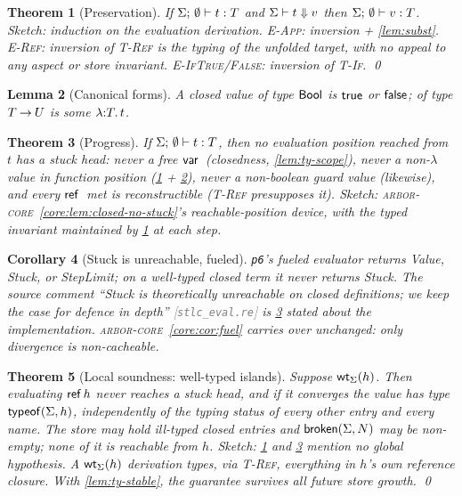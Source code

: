 \documentclass[11pt]{article}
\theoremstyle{definition}
\theoremstyle{plain}
\newtheorem{theorem}{Theorem}[section]
\newtheorem{lemma}[theorem]{Lemma}
\newtheorem{corollary}[theorem]{Corollary}
\theoremstyle{remark}
\newcommand{\src}[1]{{\footnotesize\textcolor{gray}{[\texttt{#1}]}}}
\newcommand{\arborcore}{\textsc{arbor-core}}
\newcommand{\coreref}[1]{\arborcore~\cref{core:#1}}
\begin{document}
\begin{theorem}[Preservation]\label{thm:pres}
If $\Sigma;\,\emptyset \vdash t : T$ and $\Sigma \vdash t \Downarrow v$ then
$\Sigma;\,\emptyset \vdash v : T$.
\emph{Sketch:} induction on the evaluation derivation. \textsc{E-App}: inversion +
\cref{lem:subst}. \textsc{E-Ref}: inversion of \textsc{T-Ref} is the typing of the unfolded
target, with no appeal to any aspect or store invariant. \textsc{E-IfTrue/False}:
inversion of \textsc{T-If}. \qed
\end{theorem}

\begin{lemma}[Canonical forms]\label{lem:canon}
A closed value of type $\mathsf{Bool}$ is $\mathsf{true}$ or $\mathsf{false}$; of type $T \mathbin{\to} U$ is some
$\lambda{:}T.\,t$.
\end{lemma}

\begin{theorem}[Progress]\label{thm:prog}
If $\Sigma;\,\emptyset \vdash t : T$, then no evaluation position reached from $t$ has a
stuck head: never a free $\mathsf{var}\,$ (closedness, \cref{lem:ty-scope}), never a non-$\lambda$
value in function position (\cref{thm:pres} + \cref{lem:canon}), never a non-boolean guard
value (likewise), and every $\mathsf{ref}\,$ met is reconstructible (\textsc{T-Ref} presupposes
it). \emph{Sketch:} \coreref{lem:closed-no-stuck}'s reachable-position device, with the
typed invariant maintained by \cref{thm:pres} at each step.
\end{theorem}

\begin{corollary}[Stuck is unreachable, fueled]\label{cor:no-stuck}
\texttt{p6}'s fueled evaluator returns \textsf{Value}, \textsf{Stuck}, or
\textsf{StepLimit}; on a well-typed closed term it never returns \textsf{Stuck}. The source
comment ``Stuck is theoretically unreachable on closed definitions; we keep the case for
defence in depth'' \src{stlc\_eval.re} is \cref{thm:prog} stated about the implementation.
\coreref{cor:fuel} carries over unchanged: only divergence is non-cacheable.
\end{corollary}

\begin{theorem}[Local soundness: well-typed islands]\label{thm:local}
Suppose $\mathsf{wt}_{\Sigma}(h)$. Then evaluating $\mathsf{ref}\,h$ never reaches a stuck head, and if
it converges the value has type $\mathsf{typeof}(\Sigma,h)$, independently of the typing status of
every other entry and every name. The store may hold ill-typed closed entries and
$\mathsf{broken}(\Sigma,N)$ may be non-empty; none of it is reachable from $h$.
\emph{Sketch:} \cref{thm:pres} and \cref{thm:prog} mention no global hypothesis. A
$\mathsf{wt}_{\Sigma}(h)$ derivation types, via \textsc{T-Ref}, everything in $h$'s own reference
closure. With \cref{lem:ty-stable}, the guarantee survives all future store growth. \qed
\end{theorem}
\end{document}
